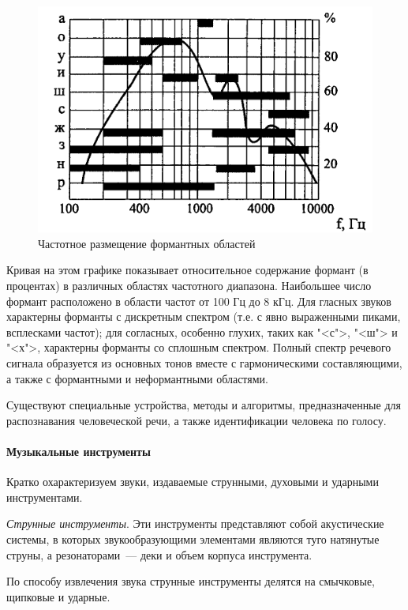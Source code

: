 \documentclass[oneside, final, 14pt]{extreport}
\begin{document}
\begin{figure}[h]
\centering
\includegraphics{pic-soundkind-02}
\caption{Частотное размещение формантных областей}
\label{pic-soundkind-02}
\end{figure}

Кривая на этом графике показывает относительное содержание формант (в процентах) в различных областях частотного диапазона. Наибольшее число формант расположено в области частот от 100 Гц до 8 кГц. Для гласных звуков характерны форманты с дискретным спектром (т.е. с явно выраженными пиками, всплесками
частот); для согласных, особенно глухих, таких как "<с">, "<ш"> и "<х">, характерны форманты со сплошным спектром. Полный спектр речевого сигнала образуется из основных тонов вместе с гармоническими составляющими, а также с формантными и неформантными областями.

Существуют специальные устройства, методы и алгоритмы, предназначенные для распознавания человеческой речи, а также идентификации человека по голосу.

\paragraph{Музыкальные инструменты}
Кратко охарактеризуем звуки, издаваемые струнными, духовыми и ударными
инструментами.

{\itshape Струнные инструменты}. Эти инструменты представляют собой акустические системы, в которых звукообразующими элементами являются туго натянутые струны, а резонаторами~--- деки и объем корпуса инструмента.

По способу извлечения звука струнные инструменты делятся на смычковые, щипковые и ударные.
\end{document}
